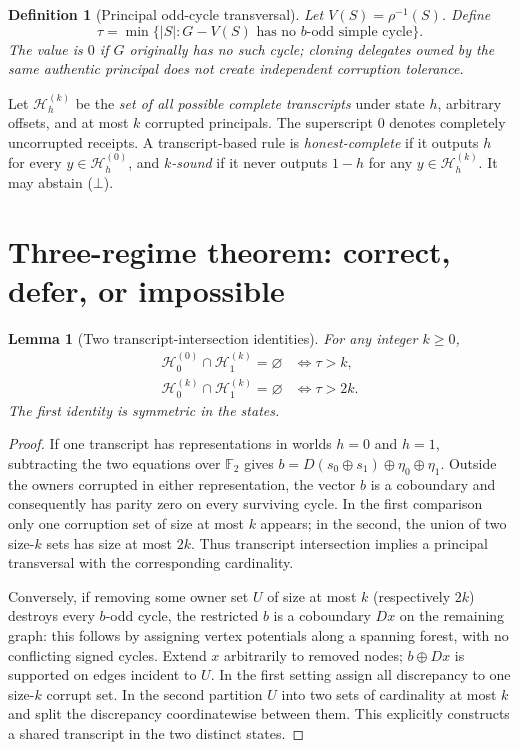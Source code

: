 \documentclass[10pt,a4paper]{article}
\newtheorem{lemma}[theorem]{Lemma}
\newtheorem{definition}[theorem]{Definition}
\newcommand{\F}{\mathbb F_2}
\newcommand{\Hon}{\mathcal H}
\newcommand{\xor}{\mathbin\oplus}
\begin{document}
\begin{definition}[Principal odd-cycle transversal]
Let $V(S)=\rho^{-1}(S)$. Define
\begin{equation}\label{eq:tau}
 \tau=\min\big\{|S|:G-V(S)\text{ has no $b$-odd simple cycle}\big\}.
\end{equation}
The value is $0$ if $G$ originally has no such cycle; cloning delegates owned by the same authentic principal does not create independent corruption tolerance.
\end{definition}

Let $\Hon_h^{(k)}$ be the \emph{set of all possible complete transcripts} under state $h$, arbitrary offsets, and at most $k$ corrupted principals. The superscript $0$ denotes completely uncorrupted receipts. A transcript-based rule is \emph{honest-complete} if it outputs $h$ for every $y\in\Hon_h^{(0)}$, and \emph{$k$-sound} if it never outputs $1-h$ for any $y\in\Hon_h^{(k)}$. It may abstain ($\bot$).

\section{Three-regime theorem: correct, defer, or impossible}
\begin{lemma}[Two transcript-intersection identities]\label{lem:intersection}
For any integer $k\ge0$,
\begin{align}
 \Hon_0^{(0)}\cap\Hon_1^{(k)}=\varnothing &\iff \tau>k,\label{eq:one}\\
 \Hon_0^{(k)}\cap\Hon_1^{(k)}=\varnothing &\iff \tau>2k.\label{eq:two}
\end{align}
The first identity is symmetric in the states.
\end{lemma}
\begin{proof}
If one transcript has representations in worlds $h=0$ and $h=1$, subtracting the two equations over $\F$ gives $b=D(s_0\xor s_1)\xor\eta_0\xor\eta_1$. Outside the owners corrupted in either representation, the vector $b$ is a coboundary and consequently has parity zero on every surviving cycle. In the first comparison only one corruption set of size at most $k$ appears; in the second, the union of two size-$k$ sets has size at most $2k$. Thus transcript intersection implies a principal transversal with the corresponding cardinality.

Conversely, if removing some owner set $U$ of size at most $k$ (respectively $2k$) destroys every $b$-odd cycle, the restricted $b$ is a coboundary $Dx$ on the remaining graph: this follows by assigning vertex potentials along a spanning forest, with no conflicting signed cycles. Extend $x$ arbitrarily to removed nodes; $b\xor Dx$ is supported on edges incident to $U$. In the first setting assign all discrepancy to one size-$k$ corrupt set. In the second partition $U$ into two sets of cardinality at most $k$ and split the discrepancy coordinatewise between them. This explicitly constructs a shared transcript in the two distinct states.\end{proof}
\end{document}
